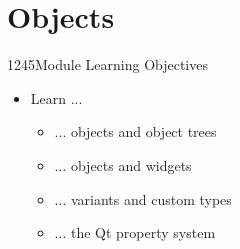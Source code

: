 \section{Objects}

\begin{slide}{1245}{Module Learning Objectives}
\begin{itemize}
\item Learn ...
  \begin{itemize}
  \item ... objects and object trees
  \item ... objects and widgets
  \item ... variants and custom types
  \item ... the Qt property system
  \end{itemize}
\end{itemize}

\end{slide}






